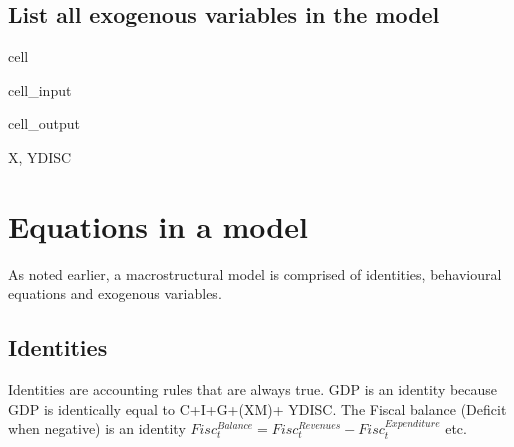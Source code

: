 \documentclass[letterpaper,10pt,english]{jupyterBook}
\begin{document}
\subsection{List all exogenous variables in the model}
\label{\detokenize{content/05_SimpleModel/SimpleModel:list-all-exogenous-variables-in-the-model}}
\begin{sphinxuseclass}{cell}\begin{sphinxVerbatimInput}

\begin{sphinxuseclass}{cell_input}
\begin{sphinxVerbatim}[commandchars=\\\{\}]
             
\end{sphinxVerbatim}

\end{sphinxuseclass}\end{sphinxVerbatimInput}
\begin{sphinxVerbatimOutput}

\begin{sphinxuseclass}{cell_output}
\begin{sphinxVerbatim}[commandchars=\\\{\}]
\PYGZob{}\PYGZsq{}X\PYGZsq{}, \PYGZsq{}YDISC\PYGZsq{}\PYGZcb{}
\end{sphinxVerbatim}

\end{sphinxuseclass}\end{sphinxVerbatimOutput}

\end{sphinxuseclass}

\section{Equations in a  model}
\label{\detokenize{content/05_SimpleModel/SimpleModel:equations-in-a-modelflow-model}}
\sphinxAtStartPar
As noted earlier, a macrostructural model is comprised of identities, behavioural equations and exogenous variables.


\subsection{Identities}
\label{\detokenize{content/05_SimpleModel/SimpleModel:identities}}
\sphinxAtStartPar
Identities are accounting rules that are always true.  GDP is an identity because GDP is identically equal to C+I+G+(X\sphinxhyphen{}M)+ YDISC.  The Fiscal balance (Deficit when negative) is an identity \(Fisc^{Balance}_t=Fisc^{Revenues}_t-Fisc^{Expenditure}_t\) etc.
\end{document}
